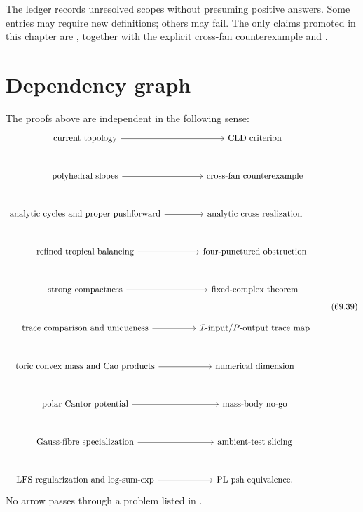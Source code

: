 \begin{remark}
\label{rem:verified-read-ledger}
The ledger records unresolved scopes without presuming positive answers.
Some entries may require new definitions; others may fail. The only
claims promoted in this chapter are
,
together with the explicit cross-fan counterexample and
.
\end{remark}

\section{Dependency graph}
\label{sec:verified-dependencies}

The proofs above are independent in the following sense:
\[
\begin{tikzcd}[column sep=large,row sep=large]
\text{current topology}
 \arrow[r]
&\text{CLD criterion}\\
\text{polyhedral slopes}
 \arrow[r]
&\text{cross-fan counterexample}\\
\text{analytic cycles and proper pushforward}
 \arrow[r]
&\text{analytic cross realization}\\
\text{refined tropical balancing}
 \arrow[r]
&\text{four-punctured obstruction}\\
\text{strong compactness}
 \arrow[r]
&\text{fixed-complex theorem}\\
\text{trace comparison and uniqueness}
 \arrow[r]
&\text{$\mathcal I$-input/$P$-output trace map}\\
\text{toric convex mass and Cao products}
 \arrow[r]
&\text{numerical dimension}\\
\text{polar Cantor potential}
 \arrow[r]
&\text{mass-body no-go}\\
\text{Gauss-fibre specialization}
 \arrow[r]
&\text{ambient-test slicing}\\
\text{LFS regularization and log-sum-exp}
 \arrow[r]
&\text{PL psh equivalence}.
\end{tikzcd}
\tag{69.39}\label{eq:verified-dependency-graph}
\]
No arrow passes through a problem listed in
.

